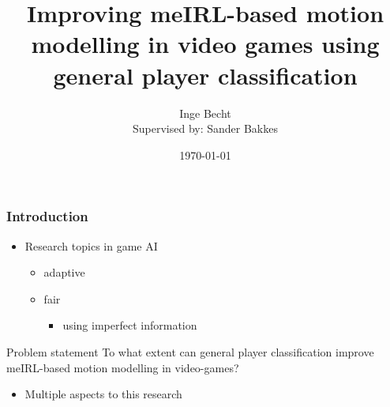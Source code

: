 \documentclass{beamer}
\title[Improving meIRL-based motion modelling]{Improving meIRL-based motion modelling in video
games using general player classification}
\author[Inge Becht]{\large{Inge Becht}\\{\small Supervised by: Sander Bakkes}}
\institute[Universiteit van Amsterdam]
{\large Universiteit van Amsterdam}
\date{\today}
\begin{document}
%
\begin{frame}
    \titlepage
\end{frame}

\begin{frame}
    \frametitle{Introduction}
    \begin{itemize}
        \item{Research topics in game AI}
            \begin{itemize}
                \item adaptive
                \item fair
                    \begin{itemize}
                        \item using imperfect information
                    \end{itemize}
            \end{itemize}
    \end{itemize}
    \begin{block}{Problem statement}
        To what extent can general player classification improve meIRL-based motion modelling
        in video-games?
    \end{block}
    \begin{itemize}
        \item Multiple aspects to this research
    \end{itemize}
\end{frame}
\end{document}
